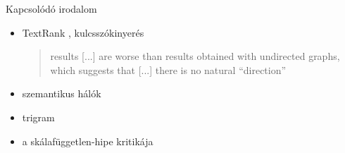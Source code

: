 \documentclass{beamer}
\newlength{\onecolwid}
\begin{document}
\begin{frame}[t]
\begin{columns}[t]
\begin{column}{\onecolwid}

      \begin{block}{Kapcsolódó irodalom}
        \begin{itemize}
          \item TextRank \citep{mihalcea2004textrank}, kulcsszókinyerés
            \begin{quote}
              results [...] are worse than results obtained with undirected
                graphs, which suggests that [...] there is no natural “direction”
            \end{quote}
          \item szemantikus hálók \citep{steyvers2005large}
          \item trigram \citep{cancho2001thesmall}
          \item a skálafüggetlen-hipe kritikája
            \citep{willinger2009mathematics}
        \end{itemize}
      \end{block}


\end{column}
\end{columns}
\end{frame}
\end{document}
